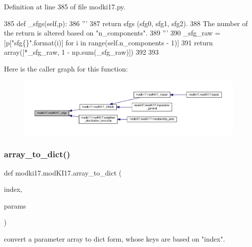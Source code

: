 Definition at line 385 of file modki17.\+py.


\begin{DoxyCode}
385     \textcolor{keyword}{def }\_sfgs(self,p):
386         \textcolor{stringliteral}{'''}
387 \textcolor{stringliteral}{        return sfgs (sfg0, sfg1, sfg2).}
388 \textcolor{stringliteral}{        The number of the return is altered based on "n\_components".}
389 \textcolor{stringliteral}{        '''}
390         \_sfg\_raw = [p[\textcolor{stringliteral}{"sfg\{\}"}.format(i)] \textcolor{keywordflow}{for} i \textcolor{keywordflow}{in} range(self.n\_components - 1)]
391         \textcolor{keywordflow}{return} array([*\_sfg\_raw, 1 - np.sum(\_sfg\_raw)])
392     
393     
\end{DoxyCode}
Here is the caller graph for this function\+:\nopagebreak
\begin{figure}[H]
\begin{center}
\leavevmode
\includegraphics[width=350pt]{df/da3/classmodki17_1_1modKI17_a23a8694e674a462a35cebe0d7ddc00fb_icgraph}
\end{center}
\end{figure}
\mbox{\label{classmodki17_1_1modKI17_a3dbb8b3805bcb0e1253c367f016a6073}} 
\subsubsection{\texorpdfstring{array\+\_\+to\+\_\+dict()}{array\_to\_dict()}}
{\footnotesize\ttfamily def modki17.\+mod\+K\+I17.\+array\+\_\+to\+\_\+dict (\begin{DoxyParamCaption}\item[{}]{index,  }\item[{}]{params }\end{DoxyParamCaption})\hspace{0.3cm}{\ttfamily [static]}}

\begin{DoxyVerb}convert a parameter array to dict form, whose keys are based on "index".
\end{DoxyVerb}
 

